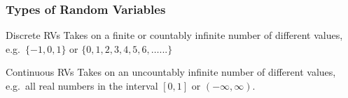 \documentclass[handout]{beamer}
\begin{document}
% 	 
\begin{frame}
\frametitle{Types of Random Variables}
 
	\begin{block}{Discrete RVs}
	Takes on a finite or countably infinite number of different values, e.g.\  $\{-1, 0, 1\}$ or $\{0, 1, 2, 3, 4, 5, 6, \hdots ...\}$
	\end{block}
 	
	\begin{block}{Continuous RVs}
	Takes on an uncountably infinite number of different values, e.g.\ all real numbers in the interval $[0,1]$ or $(-\infty, \infty)$.
	\end{block}

\end{frame}
\end{document}
